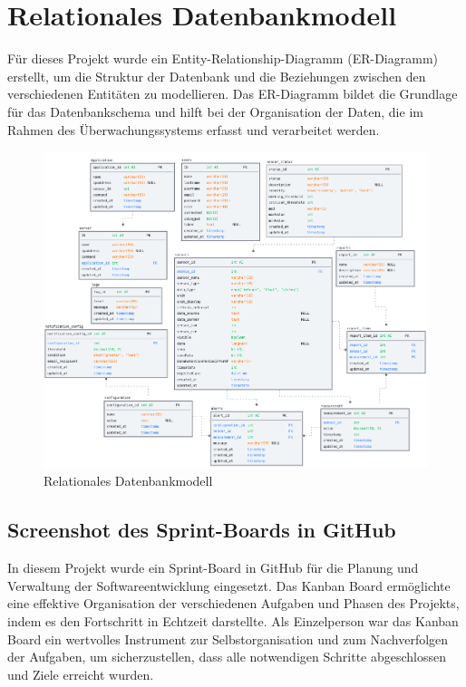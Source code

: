 \section{Relationales Datenbankmodell}\label{appendix:b}\par

Für dieses Projekt wurde ein Entity-Relationship-Diagramm (ER-Diagramm) erstellt, um die Struktur der Datenbank und die Beziehungen zwischen den verschiedenen Entitäten zu modellieren. Das ER-Diagramm bildet die Grundlage für das Datenbankschema und hilft bei der Organisation der Daten, die im Rahmen des Überwachungssystems erfasst und verarbeitet werden.
\begin{figure}[h]
	\centering
	\includegraphics[width=1\textwidth]{img/ERP-diagramm.png}
	\caption{Relationales Datenbankmodell}
	\label{Relationales Datenbankmodell}
\end{figure}
\clearpage

\subsection{Screenshot des Sprint-Boards in GitHub}\label{appendix:b1}\par


In diesem Projekt wurde ein Sprint-Board in GitHub für die Planung und Verwaltung der Softwareentwicklung eingesetzt. Das Kanban Board ermöglichte eine effektive Organisation der verschiedenen Aufgaben und Phasen des Projekts, indem es den Fortschritt in Echtzeit darstellte. Als Einzelperson war das Kanban Board ein wertvolles Instrument zur Selbstorganisation und zum Nachverfolgen der Aufgaben, um sicherzustellen, dass alle notwendigen Schritte abgeschlossen und Ziele erreicht wurden.

